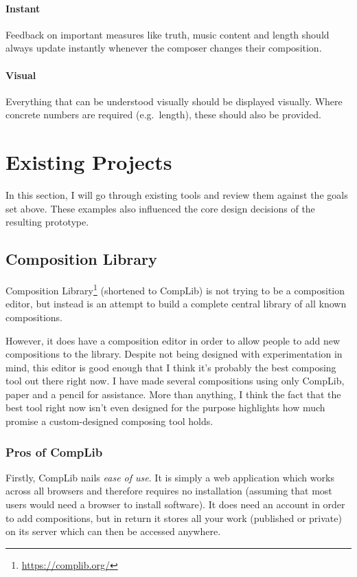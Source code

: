 \documentclass[12pt]{article}
\newcommand{\footurl}[1]{\footnote{\url{#1}}}
\begin{document}
\paragraph{Instant} Feedback on important measures like truth, music content and length should
always update instantly whenever the composer changes their composition.

\paragraph{Visual} Everything that can be understood visually should be displayed visually.  Where
concrete numbers are required (e.g.\ length), these should also be provided.



\pagebreak

\section{Existing Projects}

In this section, I will go through existing tools and review them against the goals set above.
These examples also influenced the core design decisions of the resulting prototype.

\subsection{Composition Library}

Composition Library\footurl{https://complib.org/} (shortened to CompLib) is not
trying to be a composition editor, but instead is an attempt to build a complete central library of
all known compositions.

However, it does have a composition editor in order to allow people to add new compositions to the
library.  Despite not being designed with experimentation in mind, this editor is good enough that
I think it's probably the best composing tool out there right now.  I have made several
compositions using only CompLib, paper and a pencil for assistance.  More than anything, I think the
fact that the best tool right now isn't even designed for the purpose highlights how much promise a
custom-designed composing tool holds.

\subsubsection{Pros of CompLib}

Firstly, CompLib nails \emph{ease of use}.  It is simply a web application which works across all
browsers and therefore requires no installation (assuming that most users would need a browser to
install software).  It does need an account in order to add compositions, but in return it stores
all your work (published or private) on its server which can then be accessed anywhere.
\end{document}
